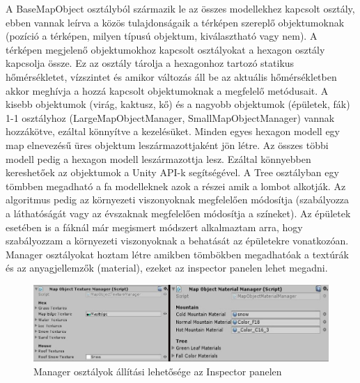 A BaseMapObject osztályból származik le az összes modellekhez kapcsolt osztály, ebben vannak leírva a közös tulajdonságaik a térképen szereplő objektumoknak (pozíció a térképen, milyen típusú objektum, kiválasztható vagy nem). A térképen megjelenő objektumokhoz kapcsolt osztályokat a hexagon osztály kapcsolja össze. Ez az osztály tárolja  a hexagonhoz tartozó statikus hőmérsékletet, vízszintet és amikor változás áll be az aktuális hőmérsékletben akkor meghívja a hozzá kapcsolt objektumoknak a megfelelő metódusait. A kisebb objektumok (virág, kaktusz, kő) és a nagyobb objektumok (épületek, fák) 1-1 osztályhoz (LargeMapObjectManager, SmallMapObjectManager) vannak hozzákötve, ezáltal könnyítve a kezelésüket.
\newline
\newline Minden egyes hexagon modell egy map elnevezésű üres objektum leszármazottjaként jön létre. Az összes többi modell pedig a hexagon modell leszármazottja lesz. Ezáltal könnyebben kereshetőek az objektumok a Unity API-k segítségével.
\newline
\newline A Tree osztályban egy tömbben megadható a fa modelleknek azok a részei amik a lombot alkotják. Az algoritmus pedig az környezeti viszonyoknak megfelelően módosítja (szabályozza a láthatóságát vagy az évszaknak megfelelően módosítja a színeket).
\newline
\newline Az épületek esetében is a fáknál már megismert módszert alkalmaztam arra, hogy szabályozzam a környezeti viszonyoknak a behatását az épületekre vonatkozóan.
\newline
\newline Manager osztályokat hoztam létre amikben tömbökben megadhatóak a textúrák és az anyagjellemzők (material), ezeket az inspector panelen lehet megadni.

\begin{figure}[h!]
\centering
\includegraphics[scale=0.6]{kepek/Managers.jpg}
\caption{Manager osztályok állítási lehetősége az Inspector panelen}
\label{fig:Managers}
\end{figure}

